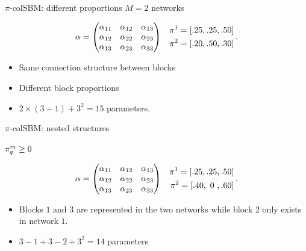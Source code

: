 \documentclass[compress,10pt]{beamer}
\begin{document}
\begin{frame}{$\pi$-colSBM:  different proportions}
  $M=2$  networks 
 
\begin{eqnarray*}
   \alpha = \begin{pmatrix}
   \alpha_{11} & \alpha_{12} & \alpha_{13} \\
   \alpha_{12} & \alpha_{22} & \alpha_{23} \\
   \alpha_{13} & \alpha_{23} & \alpha_{33}
 \end{pmatrix} & &  \begin{aligned}
                      \pi^{1} = [.25, .25, .50] \\ \pi^{2} = [.20, .50, .30]
                    \end{aligned}\, . 
\end{eqnarray*}
\begin{itemize}
  \item Same connection structure between blocks
  \item Different block proportions
  \item $2\times(3-1) + 3^2 = 15$ parameters.
\end{itemize}


\end{frame}


\begin{frame}{$\pi$-colSBM: nested structures}
 
 $\pi^{m}_q \geq 0$
 
\begin{eqnarray*}
\alpha = \begin{pmatrix}
    \alpha_{11} & \alpha_{12} & \alpha_{13} \\
    \alpha_{12} & \alpha_{22} & \alpha_{23} \\
    \alpha_{13} & \alpha_{23} & \alpha_{33}
\end{pmatrix} & &  \begin{aligned}
                      \pi^{1} = [.25, .25, .50] \\ \pi^{2} = [.40, \text{ }0\text{ }, .60]
                    \end{aligned}\, . 
\end{eqnarray*}
\begin{itemize}
 \item Blocks $1$ and $3$  are represented in the two networks while block 2 only exists in network $1$. 
 \item  $3-1 + 3-2+ 3^2 = 14$ parameters
\end{itemize}
\end{frame}
\end{document}
